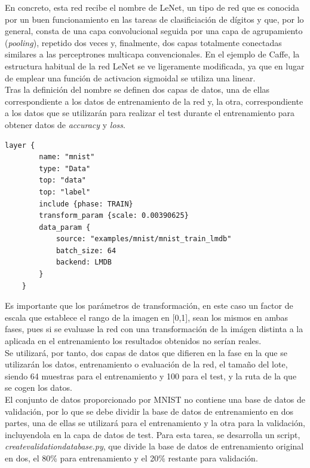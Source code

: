 	En concreto, esta red recibe el nombre de LeNet, un tipo de red que es conocida por un buen funcionamiento en las tareas de clasificiación de dígitos y que, por lo general, consta de una capa convolucional seguida por una capa de agrupamiento (\textit{pooling}), repetido dos veces y, finalmente, dos capas totalmente conectadas similares a las perceptrones multicapa convencionales. En el ejemplo de Caffe, la estructura habitual de la red LeNet se ve ligeramente modificada, ya que en lugar de emplear una función de activacion sigmoidal se utiliza una linear.\\

	Tras la definición del nombre se definen dos capas de datos, una de ellas correspondiente a los datos de entrenamiento de la red y, la otra, correspondiente a los datos que se utilizarán para realizar el test durante el entrenamiento para obtener datos de \textit{accuracy} y \textit{loss}.
	\vspace{10pt}
	\begin{lstlisting}[frame=single]
	layer {
		name: "mnist"
		type: "Data"
		top: "data"
		top: "label"
		include {phase: TRAIN}
		transform_param {scale: 0.00390625}
		data_param {
			source: "examples/mnist/mnist_train_lmdb"
			batch_size: 64
			backend: LMDB
		}
	}
	\end{lstlisting}
	
	Es importante que los parámetros de transformación, en este caso un factor de escala que establece el rango de la imagen en [0,1], sean los mismos en ambas fases, pues si se evaluase la red con una transformación de la imágen distinta a la aplicada en el entrenamiento los resultados obtenidos no serían reales.\\
	Se utilizará, por tanto, dos capas de datos que difieren en la fase en la que se utilizarán los datos, entrenamiento o evaluación de la red, el tamaño del lote, siendo 64 muestras para el entrenamiento y 100 para el test, y la ruta de la que se cogen los datos.\\
	
	El conjunto de datos proporcionado por MNIST no contiene una base de datos de validación, por lo que se debe dividir la base de datos de entrenamiento en dos partes, una de ellas se utilizará para el entrenamiento y la otra para la validación, incluyendola en la capa de datos de test. Para esta tarea, se desarrolla un script, \textit{createvalidationdatabase.py}, que divide la base de datos de entrenamiento original en dos, el 80\% para entrenamiento y el 20\% restante para validación.\\
	
